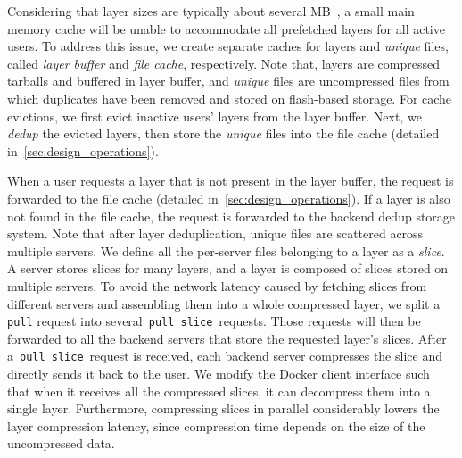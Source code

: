 

Considering that layer sizes are typically about several MB~\cite{dockerworkload}, 
a small main memory cache will be unable to accommodate
all prefetched layers for all active users. 
To address this issue, we 
create separate caches for layers and \emph{unique} files, called {\em layer buffer} and {\em file cache}, respectively. 
Note that, layers are  compressed tarballs and buffered in layer buffer, and 
 \emph{unique} files are uncompressed files from which duplicates have been removed and stored on flash-based storage. 
For 
cache evictions, we first evict inactive users' layers from the layer buffer.
Next, we \emph{dedup} the evicted layers, then store the \emph{unique} files
into the file cache (detailed in~\cref{sec:design_operations}). 

When a user requests a
layer that is not present in the layer buffer, the request is forwarded to the
file cache (detailed in~\cref{sec:design_operations}). 
If a layer is also not found in the
file cache, the request is forwarded to the backend dedup storage system.
Note that after layer deduplication, unique files are
scattered across multiple servers. 
We define all the per-server files belonging to a layer as a {\em slice}. 
A server stores slices for many layers, and a layer is composed of slices stored on multiple servers.
To avoid the network latency caused by fetching slices from different servers and
assembling them into a whole compressed layer, we split a \texttt{pull} request 
into several~\texttt{pull slice}~requests. Those requests will then be
forwarded to all the backend servers that store the requested
layer's slices. 
After a~\texttt{pull slice}~request is received, each backend server compresses the slice 
and directly sends it back to the user.
We modify the Docker client
interface such that when it receives all the compressed slices, it can
decompress them into a single layer. 
Furthermore, compressing slices in parallel considerably lowers the layer compression latency,
since compression time depends on the size of the
uncompressed data.



 
